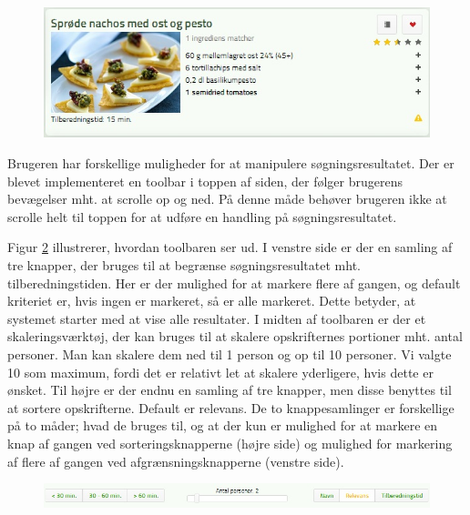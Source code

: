 \begin{figure}[H]
	\centering
	\includegraphics[scale=0.7]{billeder/foodl/opskrift.jpg}
	\label{fig:foodl-opskrift}
\end{figure}

Brugeren har forskellige muligheder for at manipulere søgningsresultatet. Der er blevet implementeret en toolbar i toppen af siden, der følger brugerens bevægelser mht. at scrolle op og ned. På denne måde behøver brugeren ikke at scrolle helt til toppen for at udføre en handling på søgningsresultatet. 

Figur \ref{fig:foodl-toolbar} illustrerer, hvordan toolbaren ser ud. I venstre side er der en samling af tre knapper, der bruges til at begrænse søgningsresultatet mht. tilberedningstiden. Her er der mulighed for at markere flere af gangen, og default kriteriet er, hvis ingen er markeret, så er alle markeret. Dette betyder, at systemet starter med at vise alle resultater. I midten af toolbaren er der et skaleringsværktøj, der kan bruges til at skalere opskrifternes portioner mht. antal personer. Man kan skalere dem ned til 1 person og op til 10 personer. Vi valgte 10 som maximum, fordi det er relativt let at skalere yderligere, hvis dette er ønsket. Til højre er der endnu en samling af tre knapper, men disse benyttes til at sortere opskrifterne. Default er relevans. De to knappesamlinger er forskellige på to måder; hvad de bruges til, og at der kun er mulighed for at markere en knap af gangen ved sorteringsknapperne (højre side) og mulighed for markering af flere af gangen ved afgrænsningsknapperne (venstre side).

\begin{figure}[H]
	\centering
	\includegraphics[scale=0.7]{billeder/foodl/toolbar.jpg}
	\label{fig:foodl-toolbar}
\end{figure}

